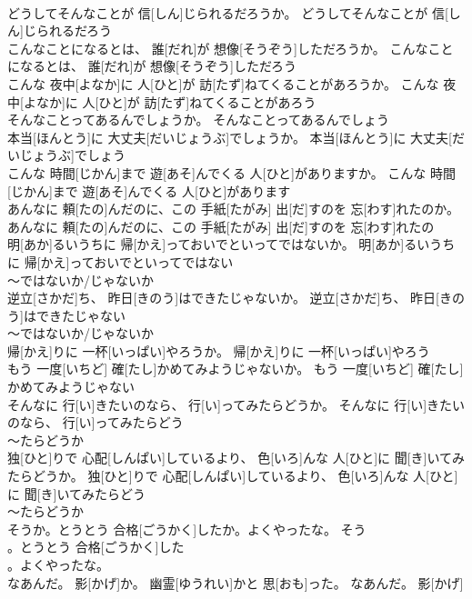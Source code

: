 \documentclass[8pt]{extreport}
\begin{document}
\begin{CJK}{UTF8}{min}
\\	どうしてそんなことが 信[しん]じられるだろうか。	どうしてそんなことが 信[しん]じられるだろう
\\	こんなことになるとは、 誰[だれ]が 想像[そうぞう]しただろうか。	こんなことになるとは、 誰[だれ]が 想像[そうぞう]しただろう
\\	こんな 夜中[よなか]に 人[ひと]が 訪[たず]ねてくることがあろうか。	こんな 夜中[よなか]に 人[ひと]が 訪[たず]ねてくることがあろう
\\	そんなことってあるんでしょうか。	そんなことってあるんでしょう
\\	本当[ほんとう]に 大丈夫[だいじょうぶ]でしょうか。	本当[ほんとう]に 大丈夫[だいじょうぶ]でしょう
\\	こんな 時間[じかん]まで 遊[あそ]んでくる 人[ひと]がありますか。	こんな 時間[じかん]まで 遊[あそ]んでくる 人[ひと]があります
\\	あんなに 頼[たの]んだのに、この 手紙[たがみ] 出[だ]すのを 忘[わす]れたのか。	あんなに 頼[たの]んだのに、この 手紙[たがみ] 出[だ]すのを 忘[わす]れたの
\\	明[あか]るいうちに 帰[かえ]っておいでといってではないか。	明[あか]るいうちに 帰[かえ]っておいでといってではない
\\	～ではないか/じゃないか 
\\	逆立[さかだ]ち、 昨日[きのう]はできたじゃないか。	逆立[さかだ]ち、 昨日[きのう]はできたじゃない
\\	～ではないか/じゃないか 
\\	帰[かえ]りに 一杯[いっぱい]やろうか。	帰[かえ]りに 一杯[いっぱい]やろう
\\	もう 一度[いちど] 確[たし]かめてみようじゃないか。	もう 一度[いちど] 確[たし]かめてみようじゃない
\\	そんなに 行[い]きたいのなら、 行[い]ってみたらどうか。	そんなに 行[い]きたいのなら、 行[い]ってみたらどう
\\	～たらどうか 
\\	独[ひと]りで 心配[しんぱい]しているより、 色[いろ]んな 人[ひと]に 聞[き]いてみたらどうか。	独[ひと]りで 心配[しんぱい]しているより、 色[いろ]んな 人[ひと]に 聞[き]いてみたらどう
\\	～たらどうか 
\\	そうか。とうとう 合格[ごうかく]したか。よくやったな。	そう
\\	。とうとう 合格[ごうかく]した
\\	。よくやったな。	
\\	なあんだ。 影[かげ]か。 幽霊[ゆうれい]かと 思[おも]った。	なあんだ。 影[かげ]

\end{CJK}
\end{document}
